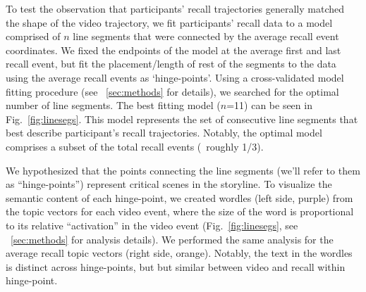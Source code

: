 \documentclass{article}
\begin{document}
{To test the observation that participants' recall trajectories generally matched the shape of the video trajectory, we fit participants' recall data to a model comprised of $n$ line segments that were connected by the average recall event coordinates. We fixed the endpoints of the model at the average first and last recall event, but fit the placement/length of rest of the segments to the data using the average recall events as `hinge-points'. Using a cross-validated model fitting procedure (see ~\ref{sec:methods} for details), we searched for the optimal number of line segments. The best fitting model ($n$=11) can be seen in Fig.~\ref{fig:linesegs}. This model represents the set of consecutive line segments that best describe participant's recall trajectories. Notably, the optimal model comprises a subset of the total recall events (~roughly 1/3). %

We hypothesized that the points connecting the line segments (we'll refer to them as ``hinge-points'') represent critical scenes in the storyline. To visualize the semantic content of each hinge-point, we created wordles (left side, purple) from the topic vectors for each video event, where the size of the word is proportional to its relative ``activation'' in the video event (Fig.~\ref{fig:linesegs}, see ~\ref{sec:methods} for analysis details). We performed the same analysis for the average recall topic vectors (right side, orange). Notably, the text in the wordles is distinct across hinge-points, but but similar between video and recall within hinge-point.

}
\end{document}
